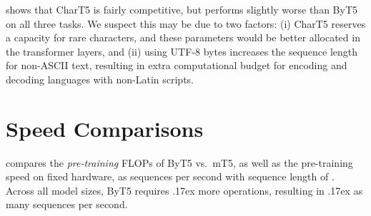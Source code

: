 \documentclass[11pt,a4paper]{article}
\newcommand{\bettertilde}{\raise.17ex\hbox{}}
\begin{document}
 shows that CharT5 is fairly competitive, but performs slightly worse than ByT5 on all three tasks. We suspect this may be due to two factors: (i) CharT5 reserves a capacity for rare characters, and these parameters would be better allocated in the transformer layers, and (ii) using UTF-8 bytes increases the sequence length for non-ASCII text, resulting in extra computational budget for encoding and decoding languages with non-Latin scripts.

\section{Speed Comparisons}
\label{sec:speed}

\begin{table}[t!]
\centering
{}
\caption{Pre-training speed and computation of mT5 vs.~ByT5. \textbf{Left}: Sequences per second pre-training on a TPUv3-64 device. \textbf{Right}: Total einsum operations for a forward pass, as logged by the T5 framework.}
\label{tab:speed_pretraining}

\end{table} 
 compares the \textit{pre-training} FLOPs of ByT5 vs.~mT5, as well as the pre-training speed on fixed hardware, as sequences per second with sequence length of . Across all model sizes, ByT5 requires \bettertilde{} more operations, resulting in \bettertilde{} as many sequences per second.
\end{document}
